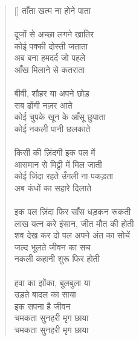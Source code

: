 \begin{verse}[\versewidth]
{ताँता खत्म ना होने पाता\\
\\
दूजों से अच्छा लगने खातिर\\
कोई पक्की दोस्ती जताता\\
अब बना हमदर्द जो पहले\\
आँख मिलाने से कतराता\\
\\
बीवी, शौहर या अपने छोड़\\
सब ढोंगी नज़र आते\\
कोई चुपके खून के आँसू छुपाता\\
कोई नकली पानी छलकाते\\
\\
किसी की ज़िंदगी इक पल में\\
आसमान से मिट्टी में मिल जाती\\
कोई ज़िंदा रहते उँगली ना पकड़ता\\
अब कंधों का सहारे दिलाते\\
\\
इक पल ज़िंदा फिर साँस धड़कन रूकती\\
लाख यत्न करे इंसान, जीत मौत की होती\\
शव देख कर दो पल अपने अंत का सोचें\\
जल्द भूलते जीवन का सच\\
नकली कहानी शुरू फिर होती\\
\\
हवा का झोंका, बुलबुला या\\
उड़ते बादल का साया\\
इक सपना है जीवन\\
चमकता सुनहरी मृग छाया\\
चमकता सुनहरी मृग छाया
}\end{verse}

